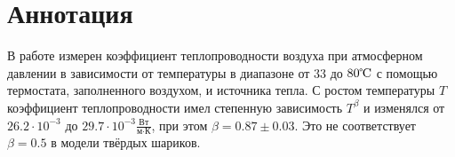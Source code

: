 \chapter*{Аннотация}

    В работе измерен коэффициент теплопроводности воздуха при атмосферном давлении в зависимости от температуры в диапазоне от $33$ до $80 \celsius$ с помощью термостата, заполненного воздухом, и источника тепла. С ростом температуры $T$ коэффициент теплопроводности имел степенную зависимость $T^{\beta}$ и изменялся от $26.2 \cdot 10^{-3}$ до $29.7 \cdot 10^{-3} \frac{\text{Вт}}{\text{м} \cdot \text{К}}$, при этом $\beta = 0.87 \pm 0.03$. Это не соответствует $\beta = 0.5$ в модели твёрдых шариков.